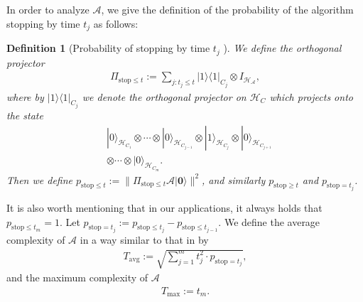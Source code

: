 \documentclass[journal]{IEEEtran}
\newtheorem{definition}{Definition}
\begin{document}
In order to analyze $\mathcal{A}$, we give the definition of the probability of the algorithm stopping by time $t_j$ as follows:
\begin{definition}[Probability of stopping by time $t_j$ {\cite[Definition 14]{chakraborty2019linear}}]
    We define the orthogonal projector
    \begin{align}
    \Pi_{\mathrm{stop} \leq t}:=\sum_{j: t_{j} \leq t}|1 \rangle\langle 1 |_{C_{j}} \otimes I_{\mathcal{H}_{\mathcal{A}}},
    \end{align}
    where by $|1\rangle\langle 1|_{C_{j}}$ we denote the orthogonal projector on $\mathcal{H}_{C}$ which projects onto the state
    \begin{align}
    &|0\rangle_{\mathcal{H}_{C_{1}}} \otimes \cdots \otimes|0\rangle_{\mathcal{H}_{C_{j-1}}} \otimes|1\rangle_{\mathcal{H}_{C_{j}}} \otimes|0\rangle_{\mathcal{H}_{C_{j+1}}} \nonumber \\&\otimes \cdots \otimes|0\rangle_{\mathcal{H}_{C_{m}}}.
    \end{align}
    Then we define $p_{\mathrm{stop} \leq t}:=\| \Pi_{\mathrm{stop} \leq t} \mathcal{A}|\mathbf{0}\rangle \|^{2}$, and similarly $p_{\mathrm{stop} \geq t}$ and $p_{\mathrm{stop}=t_j}$.
\end{definition}
It is also worth mentioning that in our applications, it always holds that $p_{\mathrm{stop}\le t_m} = 1$. Let $ p_{\mathrm{stop}=t_j} := p_{\mathrm{stop} \leq t_j}-p_{\mathrm{stop} \leq t_{j-1}}$. We define the average complexity of $\mathcal{A}$ in a way similar to that in \cite{ambainis2012variable} by
\begin{align}
    \label{eq:def_avg}
    T_{\text{avg}} := \sqrt{\sum_{j=1}^m t_j^2\cdot p_{\text{stop}=t_j}},
\end{align}
and the maximum complexity of $\mathcal{A}$
\begin{align}
    \label{eq:def_max}
    T_{\max} := t_m.
\end{align}
\end{document}
